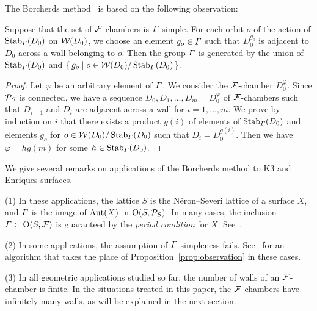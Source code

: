 \documentclass{amsart} %
\begin{document}
%
The Borcherds method~\cite{MR913200, MR1654763} is 
based on the following observation:
%
\begin{proposition}\label{prop:observation}
Suppose that the set of $\mathord{\mathcal{F}}$-chambers is $\varGamma$-simple.
For each orbit $o$ of the action of $\operatorname{Stab}_{\varGamma}(D_0)$ on $\mathord{\mathcal{W}}(D_0)$,
we choose an element $g_o\in \varGamma$ such that
$D_0^{g_o}$ is adjacent to $D_0$ across a wall
belonging to $o$.
Then the group $\varGamma$ is generated by the union of 
$\operatorname{Stab}_{\varGamma}(D_0)$ and $\{\,{g_o}\mid {o\in \mathord{\mathcal{W}}(D_0)/\operatorname{Stab}_{\varGamma}(D_0)} \,\}$.
\end{proposition}
%
\begin{proof}
Let $\varphi$ be an arbitrary element of $\varGamma$.
We consider the $\mathord{\mathcal{F}}$-chamber $D_0^{\varphi}$.
Since $\mathord{\mathcal{P}}_S$ is connected, 
we have a sequence $D_0, D_1, \dots,  D_m=D_0^{\varphi}$
of $\mathord{\mathcal{F}}$-chambers such that $D_{i-1}$ and $D_i$ are 
adjacent across a wall for $i=1, \dots, m$.
We prove by induction on $i$ that there exists 
a product $g(i)$ of elements of $\operatorname{Stab}_{\varGamma}(D_0)$ and 
 elements $g_o$ for $o\in \mathord{\mathcal{W}}(D_0)/\operatorname{Stab}_{\varGamma}(D_0)$
such that $D_i=D_0^{g(i)}$.
Then we have $\varphi=h g(m) $ for some $h\in \operatorname{Stab}_{\varGamma}(D_0)$.
\end{proof}
%
%
\begin{remark}\label{rem:geom}
We give  several remarks on  applications of the Borcherds method to K3 and Enriques surfaces.
\par
(1) 
In these applications, 
the lattice $S$ is the N\'eron--Severi lattice of a surface $X$,
and $\varGamma$ is the image of $\operatorname{Aut}(X)$ in $\mathord{\mathrm{O}}(S,\mathord{\mathcal{P}}_S)$.
In many cases, the inclusion
$\varGamma \subset \mathord{\mathrm{O}}(S,\mathord{\mathcal{F}})$
is guaranteed by the \emph{period condition} for $X$.
See~\cite[Section~5.2]{MR4759604}.
\par
(2) 
In some applications, 
the assumption of $\varGamma$-simpleness fails.
See~\cite[Section 5.1]{MR4759604} for an algorithm
that takes the place of
Proposition~\ref{prop:observation}
in these cases.
%
\par
(3) 
In all geometric applications studied so far,
the number of walls of an $\mathord{\mathcal{F}}$-chamber is finite.
In the situations treated in this paper, 
the $\mathord{\mathcal{F}}$-chambers have infinitely many walls,
as will be explained in the next section.
\end{remark}
%
%
\end{document}
